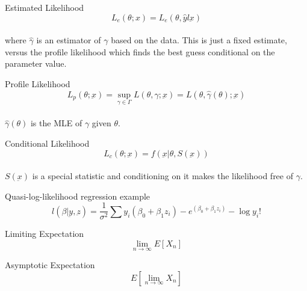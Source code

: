 \documentclass[avery5388,grid,frame]{flashcards}
\begin{document}
\begin{flashcard}[Definition]{Estimated Likelihood}
\bigskip\bigskip\bigskip
\begin{equation*}
L_e(\theta;x)=L_e(\theta,\hat{y}l\underbar{x})
\end{equation*}
\bigskip\\
where $\hat{\gamma}$ is an estimator of $\gamma$ based on the data. This is just a fixed estimate, versus the profile likelihood which finds the best guess conditional on the parameter value.
\end{flashcard}
\begin{flashcard}[Definition]{Profile Likelihood}
\bigskip\bigskip\bigskip
\begin{equation*}
L_p(\theta;\underbar{x})=\sup_{\gamma\in\Gamma}L(\theta,\gamma;\underbar{x})=L(\theta,\hat{\gamma}(\theta);\underbar{x})
\end{equation*}
\bigskip\\
$\hat{\gamma}(\theta)$ is the MLE of $\gamma$ given $\theta$.
\end{flashcard}
\begin{flashcard}[Definition]{Conditional Likelihood}
\bigskip\bigskip\bigskip
\begin{equation*}
L_c(\theta;\underbar{x})=f(\underbar{x}|\theta,S(\underbar{x}))
\end{equation*}
\bigskip\\
$S(\underbar{x})$ is a special statistic and conditioning on it makes the likelihood free of $\gamma$.
\end{flashcard}
\begin{flashcard}{Quasi-log-likelihood regression example}
\bigskip\bigskip\bigskip
\begin{equation*}
l(\beta|\underbar{y},\underbar{z})=\frac{1}{\sigma^2}\sum y_i(\beta_0+\beta_1z_i)-e^{(\beta_0+\beta_1z_i)}-\log y_i!
\end{equation*}
\end{flashcard}
\begin{flashcard}[Definition]{Limiting Expectation}
\bigskip\bigskip\bigskip
\begin{equation*}
\lim_{n\rightarrow\infty}E[X_n]
\end{equation*}
\end{flashcard}
\begin{flashcard}[Definition]{Asymptotic Expectation}
\bigskip\bigskip\bigskip
\begin{equation*}
E[\lim_{n\rightarrow\infty}X_n]
\end{equation*}
\end{flashcard}
\end{document}

